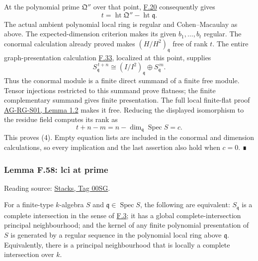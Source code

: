 \documentclass[11pt,a4paper,openany]{report}
\begin{document}
At the polynomial prime \(\mathfrak Q''\) over that point, \hyperref[AG-RG-S05-algebra-lemma-codimension]{F.20} consequently gives \[t=\operatorname{ht}\mathfrak Q''-\operatorname{ht}\mathfrak q.\] The actual ambient polynomial local ring is regular and Cohen--Macaulay as above. The expected-dimension criterion makes its given \(b_1,\ldots,b_t\) regular. The conormal calculation already proved makes \((H/H^2)_{\mathfrak q}\) free of rank \(t\). The entire graph-presentation calculation \hyperref[AG-RG-S05-algebra-lemma-conormal-module-localize]{F.33}, localized at this point, supplies \[S_{\mathfrak q}^{\,t+n}
\cong (I/I^2)_{\mathfrak q}\oplus S_{\mathfrak q}^{\,m}.\] Thus the conormal module is a finite direct summand of a finite free module. Tensor injections restricted to this summand prove flatness; the finite complementary summand gives finite presentation. The full local finite-flat proof \href{https://github.com/KokunoYumeto/open-math-courses/blob/main/docs/courses/AG-RG/AG-RG-S01.md}{AG-RG-S01, Lemma 1.2} makes it free. Reducing the displayed isomorphism to the residue field computes its rank as \[t+n-m=n-\dim_{\mathfrak q}\operatorname{Spec}S=c.\] This proves (4). Empty equation lists are included in the conormal and dimension calculations, so every implication and the last assertion also hold when \(c=0\). ∎

\label{AG-RG-S05-algebra-lemma-lci-at-prime}

\subsubsection{Lemma F.58: lci at prime}\label{AG-RG-S05-lemma-f.58-lci-at-prime}

Reading source: \href{https://stacks.math.columbia.edu/tag/00SG}{Stacks, Tag 00SG}.

For a finite-type \(k\)-algebra \(S\) and \(\mathfrak q\in\operatorname{Spec}S\), the following are equivalent: \(S_{\mathfrak q}\) is a complete intersection in the sense of \hyperref[AG-RG-S05-algebra-definition-lci-local-ring]{F.3}; it has a global complete-intersection principal neighbourhood; and the kernel of any finite polynomial presentation of \(S\) is generated by a regular sequence in the polynomial local ring above \(\mathfrak q\). Equivalently, there is a principal neighbourhood that is locally a complete intersection over \(k\).
\end{document}

